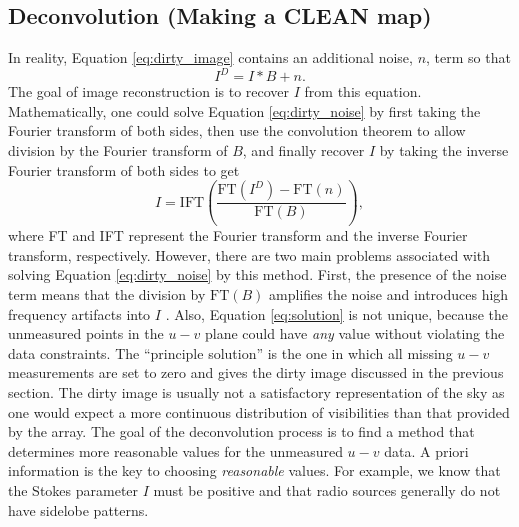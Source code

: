 \subsection{Deconvolution (Making a CLEAN map)}\label{subsec:4.3}
In reality, Equation \ref{eq:dirty_image} contains an additional noise, $n$, term so that
\begin{equation}\label{eq:dirty_noise}
I^{D}=I*B + n.
\end{equation}
The goal of image reconstruction is to recover $I$ from this equation. Mathematically, one could solve Equation \ref{eq:dirty_noise} by first taking the Fourier transform of both sides, then use the convolution theorem to allow division by the Fourier transform of $B$, and finally recover $I$ by taking the inverse Fourier transform of both sides to get
\begin{equation}\label{eq:solution}
I=\mathrm{IFT}\left(\frac{\mathrm{FT}(I^D)-\mathrm{FT}(n)}{\mathrm{FT}(B)}\right),
\end{equation}
where FT and IFT represent the Fourier transform and the inverse Fourier transform, respectively. However, there are two main problems associated with solving Equation \ref{eq:dirty_noise} by this method. First, the presence of the noise term means that the division by $\mathrm{FT}(B)$ amplifies the noise and introduces high frequency artifacts into $I$ \citep{taylor_1999}. Also, Equation \ref{eq:solution} is not unique, because the unmeasured points in the $u-v$ plane could have \textit{any} value without violating the data constraints. The ``principle solution'' is the one in which all missing $u-v$ measurements are set to zero and gives the dirty image discussed in the previous section. The dirty image is usually not a satisfactory representation of the sky as one would expect a more continuous distribution of visibilities than that provided by the array. The goal of the deconvolution process is to find a method that determines more reasonable values for the unmeasured $u-v$ data. A priori information is the key to choosing \textit{reasonable} values. For example, we know that the Stokes parameter $I$ must be positive and that radio sources generally do not have sidelobe patterns.
 
